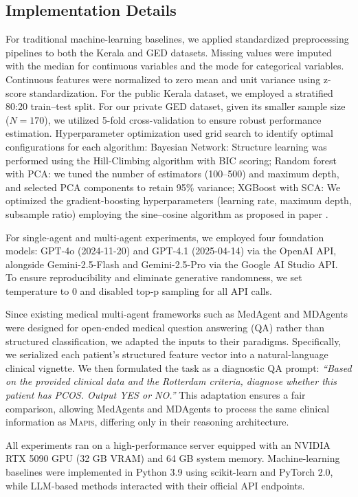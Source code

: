 \documentclass[a4paper,fleqn]{cas-dc}
\begin{document}
\subsection{Implementation Details}
For traditional machine-learning baselines, we applied standardized preprocessing pipelines to both the Kerala and GED datasets. Missing values were imputed with the median for continuous variables and the mode for categorical variables. Continuous features were normalized to zero mean and unit variance using z-score standardization.
For the public Kerala dataset, we employed a stratified 80:20 train–test split. For our private GED dataset, given its smaller sample size ($N=170$), we utilized 5-fold cross-validation to ensure robust performance estimation.
Hyperparameter optimization used grid search to identify optimal configurations for each algorithm: Bayesian Network: Structure learning was performed using the Hill-Climbing algorithm with BIC scoring; Random forest with PCA: we tuned the number of estimators (100–500) and maximum depth, and selected PCA components to retain 95\% variance; XGBoost with SCA: We optimized the gradient-boosting hyperparameters (learning rate, maximum depth, subsample ratio) employing the sine–cosine algorithm as proposed in paper \cite{Sinecosine}.

For single-agent and multi-agent experiments, we employed four foundation models: GPT-4o (2024-11-20) and GPT-4.1 (2025-04-14) via the OpenAI API, alongside Gemini-2.5-Flash and Gemini-2.5-Pro via the Google AI Studio API. To ensure reproducibility and eliminate generative randomness, we set temperature to 0 and disabled top‑p sampling for all API calls.

Since existing medical multi-agent frameworks such as MedAgent \cite{tang-etal-2024-medagents} and MDAgents \cite{kim2024mdagents} were designed for open-ended medical question answering (QA) rather than structured classification, we adapted the inputs to their paradigms. Specifically, we serialized each patient’s structured feature vector into a natural-language clinical vignette. We then formulated the task as a diagnostic QA prompt: \textit{``Based on the provided clinical data and the Rotterdam criteria, diagnose whether this patient has PCOS. Output YES or NO.''} This adaptation ensures a fair comparison, allowing MedAgents and MDAgents to process the same clinical information as \textsc{Mapis}, differing only in their reasoning architecture.

All experiments ran on a high-performance server equipped with an NVIDIA RTX 5090 GPU (32 GB VRAM) and 64 GB system memory. Machine-learning baselines were implemented in Python 3.9 using scikit-learn and PyTorch 2.0, while LLM-based methods interacted with their official API endpoints.
\end{document}
